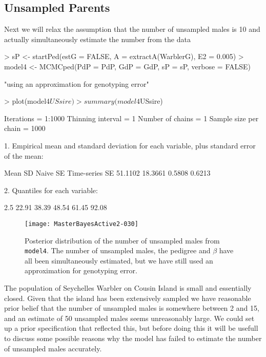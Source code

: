 \documentclass{article}
\begin{document}
\subsection{Unsampled Parents}
\label{us-sec}

Next we will relax the assumption that the number of unsampled males is 10 and actually simultaneously estimate the number from the data

\begin{Schunk}
\begin{Sinput}
> sP <- startPed(estG = FALSE, A = extractA(WarblerG), E2 = 0.005)
> model4 <- MCMCped(PdP = PdP, GdP = GdP, sP = sP, verbose = FALSE)
\end{Sinput}
\begin{Soutput}
[1] "using an approximation for genotyping error"
\end{Soutput}
\begin{Sinput}
> plot(model4$USsire)
> summary(model4$USsire)
\end{Sinput}
\begin{Soutput}
Iterations = 1:1000
Thinning interval = 1 
Number of chains = 1 
Sample size per chain = 1000 

1. Empirical mean and standard deviation for each variable,
   plus standard error of the mean:

          Mean             SD       Naive SE Time-series SE 
       51.1102        18.3661         0.5808         0.6213 

2. Quantiles for each variable:

 2.5%   25%   50%   75% 97.5% 
22.91 38.39 48.54 61.45 92.08 
\end{Soutput}
\end{Schunk}


\begin{figure}[!h]
\begin{center}
\texttt{[image: MasterBayesActive2-030]}
\end{center}
\caption{Posterior distribution of the number of unsampled males from \texttt{model4}. The number of unsampled males, the pedigree and $\beta$ have all been simultaneously estimated, but we have still used an approximation for genotyping error.}
\label{model4US-fig}
\end{figure}

The population of Seychelles Warbler on Cousin Island is small and essentially closed. Given that the island has been extensively sampled we have reasonable prior belief that the number of unsampled males is somewhere between 2 and 15, and an estimate of 50 unsampled males seems unreasonably large.  We could set up a prior specification that reflected this, but before doing this it will be usefull to discuss some possible reasons why the model has failed to estimate the number of unsampled males accurately.\\
\end{document}
